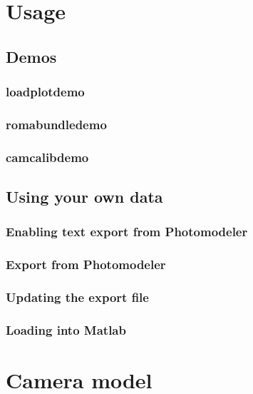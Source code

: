 \documentclass{article}
\begin{document}
\section{Usage}

\subsection{Demos}

\subsubsection{loadplotdemo}

\subsubsection{romabundledemo}

\subsubsection{camcalibdemo}

\subsection{Using your own data}

\subsubsection{Enabling text export from Photomodeler}

\subsubsection{Export from Photomodeler}

\subsubsection{Updating the export file}

\subsubsection{Loading into Matlab}

\appendix

\section{Camera model}
\end{document}
